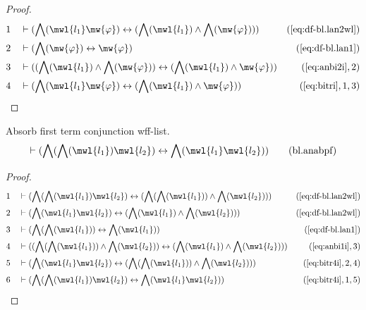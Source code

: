 \begin{proof}
\begin{align}
  1 &&  & \vdash ( \bigwedge( \mwl{l_1} \mw{\varphi} ) \leftrightarrow (
     \bigwedge( \mwl{l_1} ) \wedge \bigwedge( \mw{\varphi}
     ) ) )&(\mbox{\ref{eq:df-bl.lan2wl}})\notag
  \\ 2 &&  & \vdash ( \bigwedge( \mw{\varphi} ) \leftrightarrow \mw{\varphi}
     )&(\mbox{\ref{eq:df-bl.lan1}})\notag
  \\ 3 &&  & \vdash ( ( \bigwedge( \mwl{l_1} ) \wedge \bigwedge( \mw{\varphi} )
     ) \leftrightarrow ( \bigwedge( \mwl{l_1} ) \wedge
     \mw{\varphi} ) )&(\mbox{\ref{eq:anbi2i}},2)\notag
  \\ 4 &&  & \vdash ( \bigwedge( \mwl{l_1} \mw{\varphi} ) \leftrightarrow (
     \bigwedge( \mwl{l_1} ) \wedge \mw{\varphi} )
     )&(\mbox{\ref{eq:bitri}},1,3)\notag
\end{align}
\end{proof}

\begin{lemma} {Absorb first term conjunction wff-list.}
\begin{align}
\vdash ( \bigwedge( \bigwedge( \mwl{l_1} ) \mwl{l_2} ) \leftrightarrow
    \bigwedge( \mwl{l_1} \mwl{l_2} ) )\label{eq:bl.anabpf}\tag{bl.anabpf}
\end{align}
\end{lemma}


\begin{proof}
\begin{align}
  1 &&  & \vdash ( \bigwedge( \bigwedge( \mwl{l_1} ) \mwl{l_2} )
     \leftrightarrow ( \bigwedge( \bigwedge( \mwl{l_1} ) )
     \wedge \bigwedge( \mwl{l_2} ) )
     )&(\mbox{\ref{eq:df-bl.lan2wl}})\notag
  \\ 2 &&  & \vdash ( \bigwedge( \mwl{l_1} \mwl{l_2} ) \leftrightarrow (
     \bigwedge( \mwl{l_1} ) \wedge \bigwedge( \mwl{l_2} )
     ) )&(\mbox{\ref{eq:df-bl.lan2wl}})\notag
  \\ 3 &&  & \vdash ( \bigwedge( \bigwedge( \mwl{l_1} ) ) \leftrightarrow
     \bigwedge( \mwl{l_1} )
     )&(\mbox{\ref{eq:df-bl.lan1}})\notag
  \\ 4 &&  & \vdash ( ( \bigwedge( \bigwedge( \mwl{l_1} ) ) \wedge \bigwedge(
     \mwl{l_2} ) ) \leftrightarrow ( \bigwedge( \mwl{l_1}
     ) \wedge \bigwedge( \mwl{l_2} ) )
     )&(\mbox{\ref{eq:anbi1i}},3)\notag
  \\ 5 &&  & \vdash ( \bigwedge( \mwl{l_1} \mwl{l_2} ) \leftrightarrow (
     \bigwedge( \bigwedge( \mwl{l_1} ) ) \wedge \bigwedge(
     \mwl{l_2} ) ) )&(\mbox{\ref{eq:bitr4i}},2,4)\notag
  \\ 6 &&  & \vdash ( \bigwedge( \bigwedge( \mwl{l_1} ) \mwl{l_2} )
     \leftrightarrow \bigwedge( \mwl{l_1} \mwl{l_2} )
     )&(\mbox{\ref{eq:bitr4i}},1,5)\notag
\end{align}
\end{proof}


